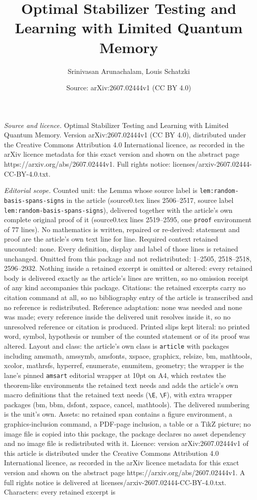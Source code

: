 \documentclass[10pt,a4paper]{amsart}
\title[Optimal Stabilizer Testing and Learning with Limited Quantum]{Optimal Stabilizer Testing and Learning with Limited Quantum Memory}
\author{Srinivasan Arunachalam, Louis Schatzki}
\date{Source: arXiv:2607.02444v1 (CC BY 4.0)}
\begin{document}
\maketitle

\noindent\emph{Source and licence.} Optimal Stabilizer Testing and Learning with Limited Quantum Memory. Version arXiv:2607.02444v1 (CC BY 4.0), distributed under the Creative Commons Attribution 4.0 International licence, as recorded in the arXiv licence metadata for this exact version and shown on the abstract page https://arxiv.org/abs/2607.02444v1. Full rights notice: licenses/arxiv-2607.02444-CC-BY-4.0.txt.\par\smallskip

\noindent\textit{Editorial scope.} Counted unit: the Lemma whose source label is \texttt{lem:random-basis-spans-signs} in the article (source0.tex lines 2506--2517, source label \texttt{lem:random-basis-spans-signs}), delivered together with the article's own complete original proof of it (source0.tex lines 2519--2595, one \texttt{proof} environment of 77 lines). No mathematics is written, repaired or re-derived: statement and proof are the article's own text line for line. Required context retained uncounted: none. Every definition, display and label of those lines is retained unchanged. Omitted from this package and not redistributed: 1--2505, 2518--2518, 2596--2932. Nothing inside a retained excerpt is omitted or altered: every retained body is delivered exactly as the article's lines are written, so no omission receipt of any kind accompanies this package. Citations: the retained excerpts carry no citation command at all, so no bibliography entry of the article is transcribed and no reference is redistributed. Reference adaptation: none was needed and none was made; every reference inside the delivered unit resolves inside it, so no unresolved reference or citation is produced. Printed slips kept literal: no printed word, symbol, hypothesis or number of the counted statement or of its proof was altered. Layout and class: the article's own class is \texttt{article} with packages including amsmath, amssymb, amsfonts, xspace, graphicx, relsize, bm, mathtools, xcolor, mathrsfs, hyperref, enumerate, enumitem, geometry; the wrapper is the lane's pinned \texttt{amsart} editorial wrapper at 10pt on A4, which restates the theorem-like environments the retained text needs and adds the article's own macro definitions that the retained text needs (\texttt{\textbackslash E}, \texttt{\textbackslash F}), with extra wrapper packages (bm, bbm, dsfont, xspace, cancel, mathtools). The delivered numbering is the unit's own. Assets: no retained span contains a figure environment, a graphics-inclusion command, a PDF-page inclusion, a table or a TikZ picture; no image file is copied into this package, the package declares no asset dependency and no image file is redistributed with it. Licence: version arXiv:2607.02444v1 of this article is distributed under the Creative Commons Attribution 4.0 International licence, as recorded in the arXiv licence metadata for this exact version and shown on the abstract page https://arxiv.org/abs/2607.02444v1. A full rights notice is delivered at licenses/arxiv-2607.02444-CC-BY-4.0.txt. Characters: every retained excerpt is 
\end{document}
